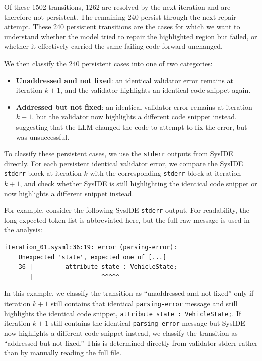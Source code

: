 Of these 1502 transitions, 1262 are resolved by the next iteration and are therefore not persistent. The remaining 240 persist through the next repair attempt. These 240 persistent transitions are the cases for which we want to understand whether the model tried to repair the highlighted region but failed, or whether it effectively carried the same failing code forward unchanged.

We then classify the 240 persistent cases into one of two categories:
\begin{itemize}
    \item \textbf{Unaddressed and not fixed}: an identical validator error remains at iteration \(k+1\), and the validator highlights an identical code snippet again.
    \item \textbf{Addressed but not fixed}: an identical validator error remains at iteration \(k+1\), but the validator now highlights a different code snippet instead, suggesting that the LLM changed the code to attempt to fix the error, but was unsuccessful.
\end{itemize}

To classify these persistent cases, we use the \texttt{stderr} outputs from SysIDE directly. For each persistent identical validator error, we compare the SysIDE \texttt{stderr} block at iteration \(k\) with the corresponding \texttt{stderr} block at iteration \(k+1\), and check whether SysIDE is still highlighting the identical code snippet or now highlights a different snippet instead.

For example, consider the following SysIDE \texttt{stderr} output. For readability, the long expected-token list is abbreviated here, but the full raw message is used in the analysis:
\begin{lstlisting}
iteration_01.sysml:36:19: error (parsing-error):
    Unexpected 'state', expected one of [...]
    36 |         attribute state : VehicleState;
       |                   ^^^^^
\end{lstlisting}
In this example, we classify the transition as ``unaddressed and not fixed'' only if iteration \(k+1\) still contains that identical \texttt{parsing-error} message and still highlights the identical code snippet, \texttt{attribute state : VehicleState;}. If iteration \(k+1\) still contains the identical \texttt{parsing-error} message but SysIDE now highlights a different code snippet instead, we classify the transition as ``addressed but not fixed.'' This is determined directly from validator stderr rather than by manually reading the full file.

